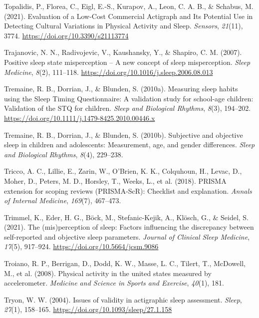 \documentclass[
]{article}
\newlength{\cslhangindent}
\newenvironment{CSLReferences}[2] %
 {\begin{list}{}{%
  \setlength{\itemindent}{0pt}
  \setlength{\leftmargin}{0pt}
  \setlength{\parsep}{0pt}
  \ifodd #1
   \setlength{\leftmargin}{\cslhangindent}
   \setlength{\itemindent}{-1\cslhangindent}
  \fi
  \setlength{\itemsep}{#2\baselineskip}}}
 {\end{list}}
\begin{document}
\begin{CSLReferences}{1}{0}
Topalidis, P., Florea, C., Eigl, E.-S., Kurapov, A., Leon, C. A. B., \& Schabus, M. (2021). Evaluation of a {Low}-{Cost} {Commercial} {Actigraph} and {Its} {Potential} {Use} in {Detecting} {Cultural} {Variations} in {Physical} {Activity} and {Sleep}. \emph{Sensors}, \emph{21}(11), 3774. \url{https://doi.org/10.3390/s21113774}

Trajanovic, N. N., Radivojevic, V., Kaushansky, Y., \& Shapiro, C. M. (2007). Positive sleep state misperception -- {A} new concept of sleep misperception. \emph{Sleep Medicine}, \emph{8}(2), 111--118. \url{https://doi.org/10.1016/j.sleep.2006.08.013}

Tremaine, R. B., Dorrian, J., \& Blunden, S. (2010a). Measuring sleep habits using the {Sleep} {Timing} {Questionnaire}: {A} validation study for school-age children: {Validation} of the {STQ} for children. \emph{Sleep and Biological Rhythms}, \emph{8}(3), 194--202. \url{https://doi.org/10.1111/j.1479-8425.2010.00446.x}

Tremaine, R. B., Dorrian, J., \& Blunden, S. (2010b). Subjective and objective sleep in children and adolescents: Measurement, age, and gender differences. \emph{Sleep and Biological Rhythms}, \emph{8}(4), 229--238.

Tricco, A. C., Lillie, E., Zarin, W., O'Brien, K. K., Colquhoun, H., Levac, D., Moher, D., Peters, M. D., Horsley, T., Weeks, L., et al. (2018). PRISMA extension for scoping reviews (PRISMA-ScR): Checklist and explanation. \emph{Annals of Internal Medicine}, \emph{169}(7), 467--473.

Trimmel, K., Eder, H. G., Böck, M., Stefanic-Kejik, A., Klösch, G., \& Seidel, S. (2021). The (mis)perception of sleep: Factors influencing the discrepancy between self-reported and objective sleep parameters. \emph{Journal of Clinical Sleep Medicine}, \emph{17}(5), 917--924. \url{https://doi.org/10.5664/jcsm.9086}

Troiano, R. P., Berrigan, D., Dodd, K. W., Masse, L. C., Tilert, T., McDowell, M., et al. (2008). Physical activity in the united states measured by accelerometer. \emph{Medicine and Science in Sports and Exercise}, \emph{40}(1), 181.

Tryon, W. W. (2004). {Issues of validity in actigraphic sleep assessment}. \emph{Sleep}, \emph{27}(1), 158--165. \url{https://doi.org/10.1093/sleep/27.1.158}


\end{CSLReferences}
\end{document}

